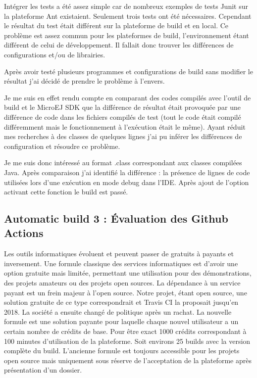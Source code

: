 \documentclass[french,a4paper,12pt]{report}
\begin{document}
Intégrer les tests a été assez simple car de nombreux exemples de tests Junit sur la plateforme Ant existaient. Seulement trois tests ont été nécessaires. Cependant le résultat du test était différent sur la plateforme de build et en local. Ce problème est assez commun pour les plateformes de build, l’environnement étant différent de celui de développement. Il fallait donc trouver les différences de configurations et/ou de librairies.

Après avoir testé plusieurs programmes et configurations de build sans modifier le résultat j’ai décidé de prendre le problème à l’envers.

Je me suis en effet rendu compte en comparant des codes compilés avec l’outil de build et le MicroEJ SDK que la différence de résultat était provoquée par une différence de code dans les fichiers compilés de test (tout le code était compilé différemment mais le fonctionnement à l’exécution était le même). Ayant réduit mes recherches à des classes de quelques lignes j’ai pu inférer les différences de configuration et résoudre ce problème.

Je me suis donc intéressé au format .class correspondant aux classes compilées Java. 
Après comparaison j’ai identifié la différence : la présence de lignes de code utilisées lors d'une exécution en mode debug dans l’IDE. Après ajout de l’option activant cette fonction le build est passé.

\subsection{Automatic build 3 : Évaluation des Github Actions}

Les outils informatiques évoluent et peuvent passer de gratuits à payants et inversement. Une formule classique des services informatiques est d’avoir une option gratuite mais limitée, permettant une utilisation pour des démonstrations, des projets amateurs ou des projets open sources. La dépendance à un service payant est un frein majeur à l’open source. Notre projet, étant open source, une solution gratuite de ce type correspondrait et Travis CI la proposait jusqu’en 2018. La société a ensuite changé de politique après un rachat. La nouvelle formule est une solution payante pour laquelle chaque nouvel utilisateur a un certain nombre de crédits de base. Pour être exact 1000 crédits correspondant à 100 minutes d’utilisation de la plateforme. Soit environs 25 builds avec la version complète du build. L'ancienne formule est toujours accessible pour les projets open source mais uniquement sous réserve de l'acceptation de la plateforme après présentation d'un dossier.
\end{document}

